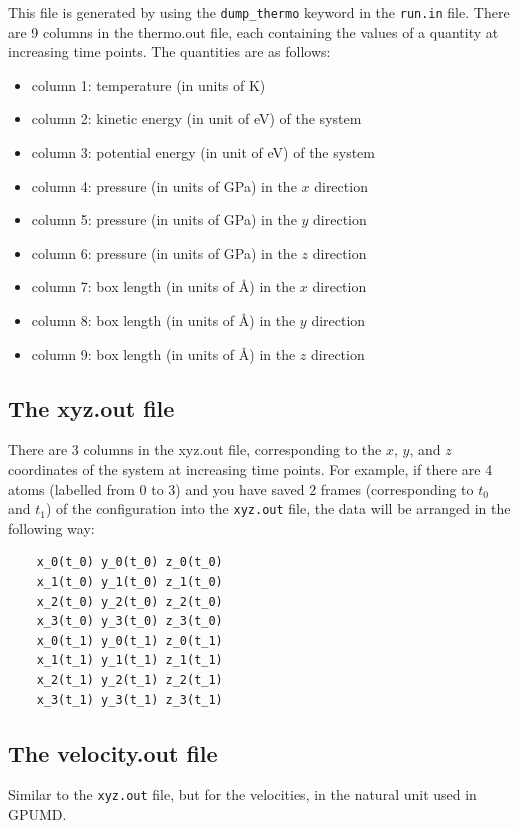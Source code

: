 \documentclass[12pt,a4paper]{report}
\begin{document}
This file is generated by using the \verb"dump_thermo" keyword in the \verb"run.in" file.
There are 9 columns in the thermo.out file, each containing the values of a quantity at increasing time points. The quantities are as follows:
\begin{itemize}
\item column 1: temperature (in units of K)
\item column 2: kinetic energy (in unit of eV) of the system
\item column 3: potential energy (in unit of eV) of the system
\item column 4: pressure (in units of GPa) in the $x$ direction
\item column 5: pressure (in units of GPa) in the $y$ direction
\item column 6: pressure (in units of GPa) in the $z$ direction
\item column 7: box length (in units of \AA) in the $x$ direction
\item column 8: box length (in units of \AA) in the $y$ direction
\item column 9: box length (in units of \AA) in the $z$ direction
\end{itemize}


\subsection{The xyz.out file}

There are 3 columns in the xyz.out file, corresponding to the $x$, $y$, and $z$ coordinates of the system at increasing time points. For example, if there are 4 atoms (labelled from 0 to 3) and you have saved 2 frames (corresponding to $t_0$ and $t_1$) of the configuration into the \verb"xyz.out" file, the data will be arranged in the following way:
\begin{verbatim}
    x_0(t_0) y_0(t_0) z_0(t_0)
    x_1(t_0) y_1(t_0) z_1(t_0)
    x_2(t_0) y_2(t_0) z_2(t_0)
    x_3(t_0) y_3(t_0) z_3(t_0)
    x_0(t_1) y_0(t_1) z_0(t_1)
    x_1(t_1) y_1(t_1) z_1(t_1)
    x_2(t_1) y_2(t_1) z_2(t_1)
    x_3(t_1) y_3(t_1) z_3(t_1)
\end{verbatim}

\subsection{The velocity.out file}

Similar to the \verb"xyz.out" file, but for the velocities, in the natural unit used in GPUMD.
\end{document}
